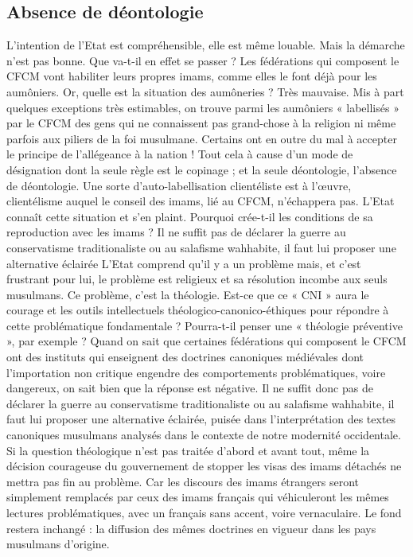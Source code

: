 \subsection*{Absence de déontologie}
L’intention de l’Etat est compréhensible, elle est même louable. Mais la démarche n’est pas bonne. Que va-t-il en effet se passer ? Les fédérations qui composent le CFCM vont habiliter leurs propres imams, comme elles le font déjà pour les aumôniers. Or, quelle est la situation des aumôneries ? Très mauvaise. Mis à part quelques exceptions très estimables, on trouve parmi les aumôniers « labellisés » par le CFCM des gens qui ne connaissent pas grand-chose à la religion ni même parfois aux piliers de la foi musulmane. Certains ont en outre du mal à accepter le principe de l’allégeance à la nation ! Tout cela à cause d’un mode de désignation dont la seule règle est le copinage ; et la seule déontologie, l’absence de déontologie. Une sorte d’auto-labellisation clientéliste est à l’œuvre, clientélisme auquel le conseil des imams, lié au CFCM, n’échappera pas. L’Etat connaît cette situation et s’en plaint. Pourquoi crée-t-il les conditions de sa reproduction avec les imams ?
Il ne suffit pas de déclarer la guerre au conservatisme traditionaliste ou au salafisme wahhabite, il faut lui proposer une alternative éclairée
L’Etat comprend qu’il y a un problème mais, et c’est frustrant pour lui, le problème est religieux et sa résolution incombe aux seuls musulmans. Ce problème, c’est la théologie. Est-ce que ce « CNI » aura le courage et les outils intellectuels théologico-canonico-éthiques pour répondre à cette problématique fondamentale ? Pourra-t-il penser une « théologie préventive », par exemple ? Quand on sait que certaines fédérations qui composent le CFCM ont des instituts qui enseignent des doctrines canoniques médiévales dont l’importation non critique engendre des comportements problématiques, voire dangereux, on sait bien que la réponse est négative. Il ne suffit donc pas de déclarer la guerre au conservatisme traditionaliste ou au salafisme wahhabite, il faut lui proposer une alternative éclairée, puisée dans l’interprétation des textes canoniques musulmans analysés dans le contexte de notre modernité occidentale.
Si la question théologique n’est pas traitée d’abord et avant tout, même la décision courageuse du gouvernement de stopper les visas des imams détachés ne mettra pas fin au problème. Car les discours des imams étrangers seront simplement remplacés par ceux des imams français qui véhiculeront les mêmes lectures problématiques, avec un français sans accent, voire vernaculaire. Le fond restera inchangé : la diffusion des mêmes doctrines en vigueur dans les pays musulmans d’origine.
